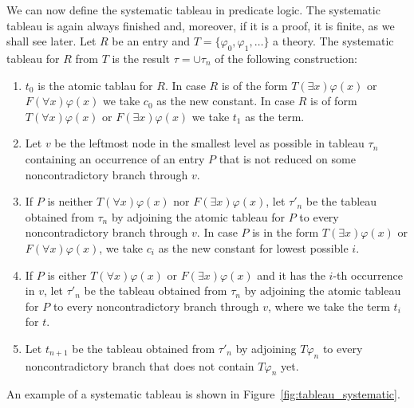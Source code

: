We can now define the systematic tableau in predicate logic. The systematic tableau is again always finished and, moreover, if it is a proof, it is finite, as we shall see later. Let $R$ be an entry and $T=\{\varphi_0, \varphi_1, \dots\}$ a theory. The systematic tableau for $R$ from $T$ is the result $\tau = \cup \tau_n$ of the following construction:
\begin{enumerate}
  \item $t_0$ is the atomic tablau for $R$. In case $R$ is of the form $T(\exists x)\varphi(x)$ or $F(\forall x) \varphi(x)$ we take $c_0$ as the new constant. In case $R$ is of form $T(\forall x) \varphi(x)$ or $F(\exists x) \varphi(x)$ we take $t_1$ as the term.
  \item Let $v$ be the leftmost node in the smallest level as possible in tableau $\tau_n$ containing an occurrence of an entry $P$ that is not reduced on some noncontradictory branch through $v$.
  \item If $P$ is neither $T(\forall x)\varphi(x)$ nor $F(\exists x)\varphi(x)$, let $\tau'_n$ be the tableau obtained from $\tau_n$ by adjoining the atomic tableau for $P$ to every noncontradictory branch through $v$. In case $P$ is in the form $T(\exists x)\varphi(x)$ or $F(\forall x) \varphi(x)$, we take $c_i$ as the new constant for lowest possible $i$.
  \item If $P$ is either $T(\forall x)\varphi(x)$ or $F(\exists x)\varphi(x)$ and it has the $i$-th occurrence in $v$, let $\tau'_n$ be the tableau obtained from $\tau_n$ by adjoining the atomic tableau for $P$ to every noncontradictory branch through $v$, where we take the term $t_i$ for $t$.
  \item Let $t_{n+1}$ be the tableau obtained from $\tau'_n$ by adjoining $T \varphi_n$ to every noncontradictory branch that does not contain $T \varphi_n$ yet.
\end{enumerate}  

An example of a systematic tableau is shown in Figure~\ref{fig:tableau_systematic}.

